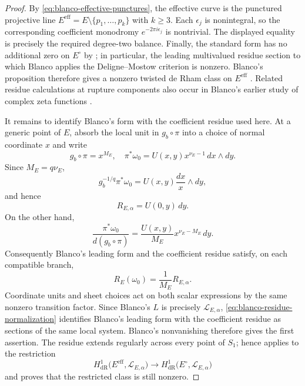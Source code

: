 \documentclass[12pt]{amsart}
\numberwithin{equation}{section}
\theoremstyle{plain}
\theoremstyle{definition}
\theoremstyle{remark}
\theoremstyle{definition}
\newcommand{\Lcal}{\mathscr L}
\begin{document}
\begin{proof}
By \eqref{eq:blanco-effective-punctures}, the effective curve is the punctured projective line $E^{\mathrm{eff}}=E\setminus\{p_1,\ldots,p_k\}$ with $k\geq3$. Each $\epsilon_j$ is nonintegral, so the corresponding coefficient monodromy $e^{-2\pi i\epsilon_j}$ is nontrivial. The displayed equality is precisely the required degree-two balance. Finally, the standard form has no additional zero on $E^\circ$ by ; in particular, the leading multivalued residue section to which Blanco applies the Deligne--Mostow criterion \cite[Proposition~2.14]{DeligneMostow1986} is nonzero. Blanco's proposition therefore gives a nonzero twisted de Rham class on $E^{\mathrm{eff}}$ \cite[Proposition~7.1 and Section~7.3]{Blanco2026}. Related residue calculations at rupture components also occur in Blanco's earlier study of complex zeta functions \cite{Blanco2019}.

It remains to identify Blanco's form with the coefficient residue used here. At a generic point of $E$, absorb the local unit in $g_b\circ\pi$ into a choice of normal coordinate $x$ and write
\begin{equation*}
g_b\circ\pi=x^{M_E},
 \quad
 \pi^*\omega_0
 =
 U(x,y)x^{\nu_E-1}\,dx\wedge dy.
\end{equation*}
Since $M_E=q\nu_E$,
\begin{equation*}
g_b^{-1/q}\pi^*\omega_0
 =
 U(x,y)\frac{dx}{x}\wedge dy,
\end{equation*}
and hence
\begin{equation*}
R_{E,\alpha}=U(0,y)\,dy.
\end{equation*}
On the other hand,
\begin{equation*}
\frac{\pi^*\omega_0}{d(g_b\circ\pi)}
 =
 \frac{U(x,y)}{M_E}x^{\nu_E-M_E}\,dy.
\end{equation*}
Consequently Blanco's leading form and the coefficient residue satisfy, on each compatible branch,
\begin{equation}\label{eq:blanco-residue-normalization}
 R_E(\omega_0)=\frac1{M_E}R_{E,\alpha}.
\end{equation}
Coordinate units and sheet choices act on both scalar expressions by the same nonzero transition factor. Since Blanco's $L$ is precisely $\Lcal_{E,\alpha}$, \eqref{eq:blanco-residue-normalization} identifies Blanco's leading form with the coefficient residue as sections of the same local system. Blanco's nonvanishing therefore gives the first assertion. The residue extends regularly across every point of $S_1$; hence  applies to the restriction
\begin{equation*}
H^1_{\mathrm{dR}}
 \bigl(E^{\mathrm{eff}},\Lcal_{E,\alpha}\bigr)
 \to 
 H^1_{\mathrm{dR}}
 \bigl(E^\circ,\Lcal_{E,\alpha}\bigr)
\end{equation*}
and proves that the restricted class is still nonzero.
\end{proof}
\end{document}
